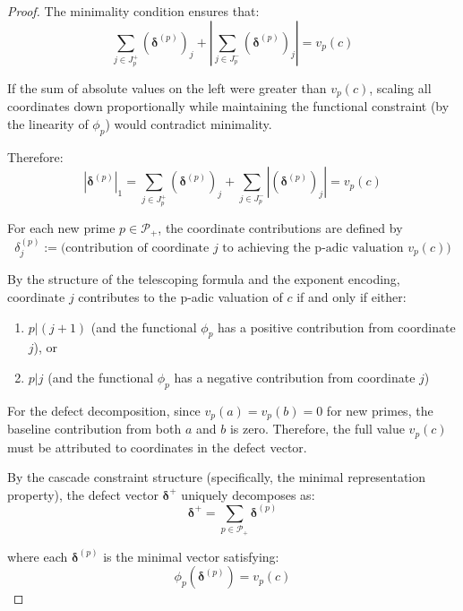 \begin{proof}
The minimality condition ensures that:
\begin{equation}
\sum_{j \in J_p^+} (\boldsymbol{\delta}^{(p)})_j + \left|\sum_{j \in J_p^-} (\boldsymbol{\delta}^{(p)})_j\right| = v_p(c)
\end{equation}

If the sum of absolute values on the left were greater than $v_p(c)$, scaling all coordinates down proportionally while maintaining the functional constraint (by the linearity of $\phi_p$) would contradict minimality.

Therefore:
\begin{equation}
|\boldsymbol{\delta}^{(p)}|_1 = \sum_{j \in J_p^+} (\boldsymbol{\delta}^{(p)})_j + \sum_{j \in J_p^-} |(\boldsymbol{\delta}^{(p)})_j| = v_p(c)
\end{equation}

For each new prime $p \in \mathcal{P}_+$, the coordinate contributions are defined by
\begin{equation}
\delta_j^{(p)} := \text{(contribution of coordinate $j$ to achieving the p-adic valuation $v_p(c)$)}
\end{equation}

By the structure of the telescoping formula and the exponent encoding, coordinate $j$ contributes to the p-adic valuation of $c$ if and only if either:
\begin{enumerate}
\item $p | (j+1)$ (and the functional $\phi_p$ has a positive contribution from coordinate $j$), or
\item $p | j$ (and the functional $\phi_p$ has a negative contribution from coordinate $j$)
\end{enumerate}

For the defect decomposition, since $v_p(a) = v_p(b) = 0$ for new primes, the baseline contribution from both $a$ and $b$ is zero. Therefore, the full value $v_p(c)$ must be attributed to coordinates in the defect vector.

By the cascade constraint structure (specifically, the minimal representation property), the defect vector $\boldsymbol{\delta}^+$ uniquely decomposes as:
\begin{equation}
\boldsymbol{\delta}^+ = \sum_{p \in \mathcal{P}_+} \boldsymbol{\delta}^{(p)}
\end{equation}

where each $\boldsymbol{\delta}^{(p)}$ is the minimal vector satisfying:
\begin{equation}
\phi_p(\boldsymbol{\delta}^{(p)}) = v_p(c)
\end{equation}


\end{proof}
